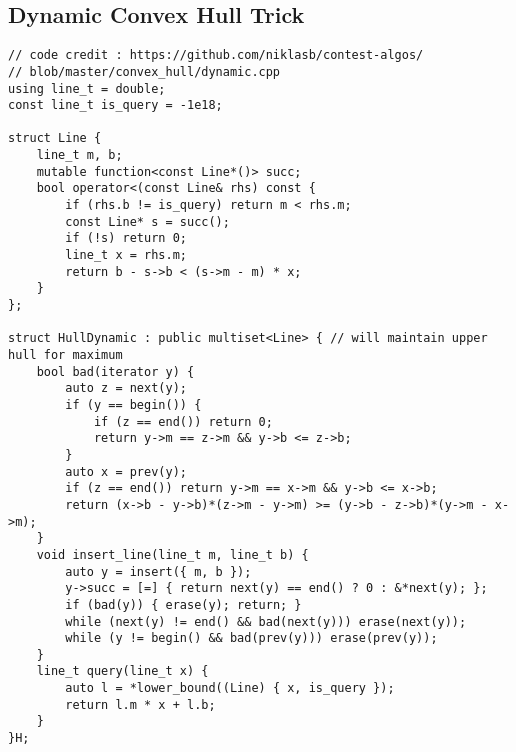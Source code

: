 \documentclass[landscape, 10pt, a4paper, oneside,  twocolumn]{article}
\begin{document}
\subsection{Dynamic Convex Hull Trick}
\begin{verbatim}
// code credit : https://github.com/niklasb/contest-algos/
// blob/master/convex_hull/dynamic.cpp
using line_t = double;
const line_t is_query = -1e18;

struct Line {
	line_t m, b;
	mutable function<const Line*()> succ;
	bool operator<(const Line& rhs) const {
		if (rhs.b != is_query) return m < rhs.m;
		const Line* s = succ();
		if (!s) return 0;
		line_t x = rhs.m;
		return b - s->b < (s->m - m) * x;
	}
};

struct HullDynamic : public multiset<Line> { // will maintain upper hull for maximum
	bool bad(iterator y) {
		auto z = next(y);
		if (y == begin()) {
			if (z == end()) return 0;
			return y->m == z->m && y->b <= z->b;
		}
		auto x = prev(y);
		if (z == end()) return y->m == x->m && y->b <= x->b;
		return (x->b - y->b)*(z->m - y->m) >= (y->b - z->b)*(y->m - x->m);
	}
	void insert_line(line_t m, line_t b) {
		auto y = insert({ m, b });
		y->succ = [=] { return next(y) == end() ? 0 : &*next(y); };
		if (bad(y)) { erase(y); return; }
		while (next(y) != end() && bad(next(y))) erase(next(y));
		while (y != begin() && bad(prev(y))) erase(prev(y));
	}
	line_t query(line_t x) {
		auto l = *lower_bound((Line) { x, is_query });
		return l.m * x + l.b;
	}
}H;
\end{verbatim}
\end{document}
